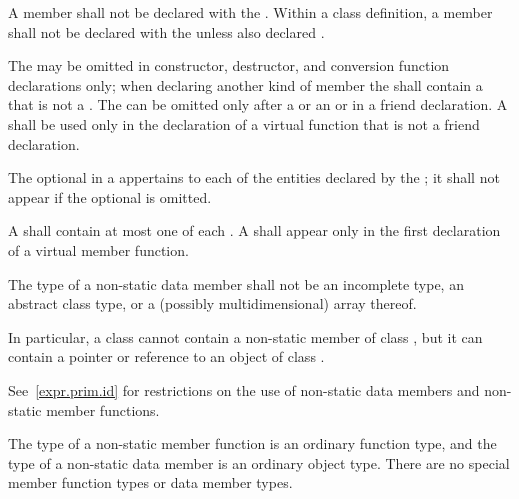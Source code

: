\pnum
A member shall not be declared with the 
. Within a class definition, a member shall not be declared with the   unless also declared .

\pnum
The  may be omitted in constructor, destructor,
and conversion function declarations only;
when declaring another kind of member the 
shall contain a  that is not a .
The
 can be omitted only after a
 or an  or in a
friend declaration. A
 shall be used only in the declaration of a
virtual function
that is not a friend declaration.

\pnum
The optional  in a 
appertains to each of the entities declared by the ;
it shall not appear if the optional  is omitted.

\pnum
A  shall contain at most one of each
.
A 
shall appear only in the first declaration of a virtual member
function.

\pnum
{}%
The type of a non-static data member shall not be an
incomplete type,
an abstract class type,
or a (possibly multidimensional) array thereof.
\begin{note}
In particular, a class  cannot contain
a non-static member of class ,
but it can contain a pointer or reference to an object of class .
\end{note}

\pnum
\begin{note}
See~\ref{expr.prim.id} for restrictions on the use of non-static data
members and non-static member functions.
\end{note}

\pnum
\begin{note}
The type of a non-static member function is an ordinary function type,
and the type of a non-static data member is an ordinary object type.
There are no special member function types or data member types.
\end{note}

